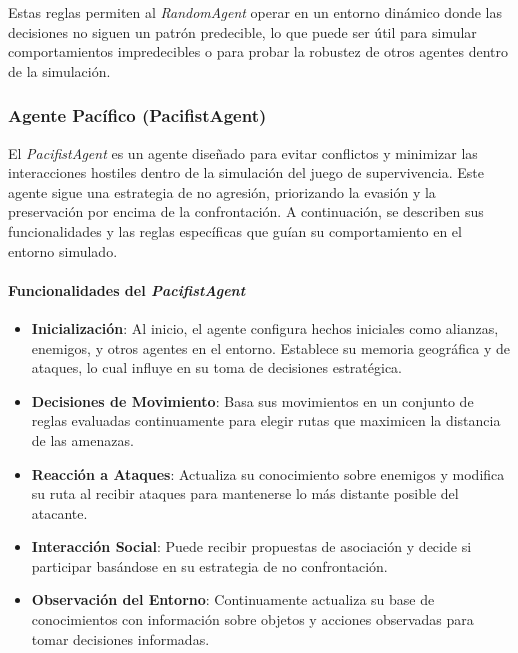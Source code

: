 \documentclass[11pt]{article}
\begin{document}
Estas reglas permiten al \textit{RandomAgent} operar en un entorno dinámico donde las decisiones no siguen un patrón predecible, lo que puede ser útil para simular comportamientos impredecibles o para probar la robustez de otros agentes dentro de la simulación.

\subsubsection{Agente Pacífico (PacifistAgent)}
El \textit{PacifistAgent} es un agente diseñado para evitar conflictos y minimizar las interacciones hostiles dentro de la simulación del juego de supervivencia. Este agente sigue una estrategia de no agresión, priorizando la evasión y la preservación por encima de la confrontación. A continuación, se describen sus funcionalidades y las reglas específicas que guían su comportamiento en el entorno simulado.

\paragraph{Funcionalidades del \textit{PacifistAgent}}
\begin{itemize}
    \item \textbf{Inicialización}: Al inicio, el agente configura hechos iniciales como alianzas, enemigos, y otros agentes en el entorno. Establece su memoria geográfica y de ataques, lo cual influye en su toma de decisiones estratégica.
    \item \textbf{Decisiones de Movimiento}: Basa sus movimientos en un conjunto de reglas evaluadas continuamente para elegir rutas que maximicen la distancia de las amenazas.
    \item \textbf{Reacción a Ataques}: Actualiza su conocimiento sobre enemigos y modifica su ruta al recibir ataques para mantenerse lo más distante posible del atacante.
    \item \textbf{Interacción Social}: Puede recibir propuestas de asociación y decide si participar basándose en su estrategia de no confrontación.
    \item \textbf{Observación del Entorno}: Continuamente actualiza su base de conocimientos con información sobre objetos y acciones observadas para tomar decisiones informadas.
\end{itemize}
\end{document}
